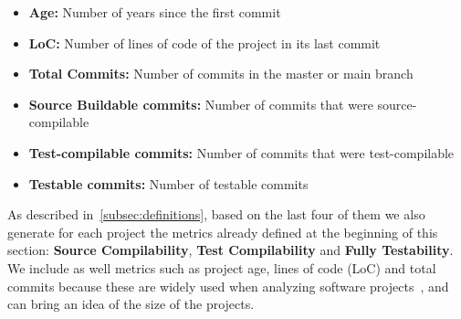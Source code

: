 \begin{itemize}
    \item \textbf{Age:} Number of years since the first commit
    \item \textbf{LoC:} Number of lines of code of the project in its last commit
    \item \textbf{Total Commits:} Number of commits in the master or main branch
    \item \textbf{Source Buildable commits:} Number of commits that were source-compilable
    \item \textbf{Test-compilable commits:} Number of commits that were test-compilable
    \item \textbf{Testable commits:} Number of testable commits
\end{itemize}


As described in~\ref{subsec:definitions}, based on the last four of them we also generate for each project the metrics already defined at the beginning of this section: \textbf{Source Compilability}, \textbf{Test Compilability} and \textbf{Fully Testability}.
We include as well metrics such as project age, lines of code (LoC) and total commits because these are widely used when analyzing software projects~\cite{yamashita2015revisiting,mannan2016understanding,rosen2015commit}, and can bring an idea of the size of the projects. 


